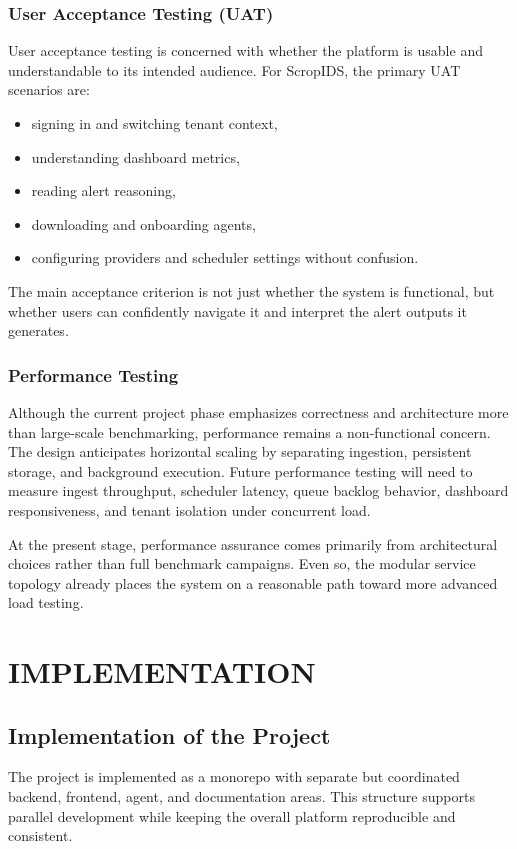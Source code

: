 \documentclass[12pt,a4paper]{article}
\begin{document}
\subsubsection{User Acceptance Testing (UAT)}
User acceptance testing is concerned with whether the platform is usable and understandable to its intended audience. For ScropIDS, the primary UAT scenarios are:

\begin{itemize}
    \item signing in and switching tenant context,
    \item understanding dashboard metrics,
    \item reading alert reasoning,
    \item downloading and onboarding agents,
    \item configuring providers and scheduler settings without confusion.
\end{itemize}

The main acceptance criterion is not just whether the system is functional, but whether users can confidently navigate it and interpret the alert outputs it generates.

\subsubsection{Performance Testing}
Although the current project phase emphasizes correctness and architecture more than large-scale benchmarking, performance remains a non-functional concern. The design anticipates horizontal scaling by separating ingestion, persistent storage, and background execution. Future performance testing will need to measure ingest throughput, scheduler latency, queue backlog behavior, dashboard responsiveness, and tenant isolation under concurrent load.

At the present stage, performance assurance comes primarily from architectural choices rather than full benchmark campaigns. Even so, the modular service topology already places the system on a reasonable path toward more advanced load testing.

\clearpage
\section{IMPLEMENTATION}

\subsection{Implementation of the Project}
The project is implemented as a monorepo with separate but coordinated backend, frontend, agent, and documentation areas. This structure supports parallel development while keeping the overall platform reproducible and consistent.
\end{document}
